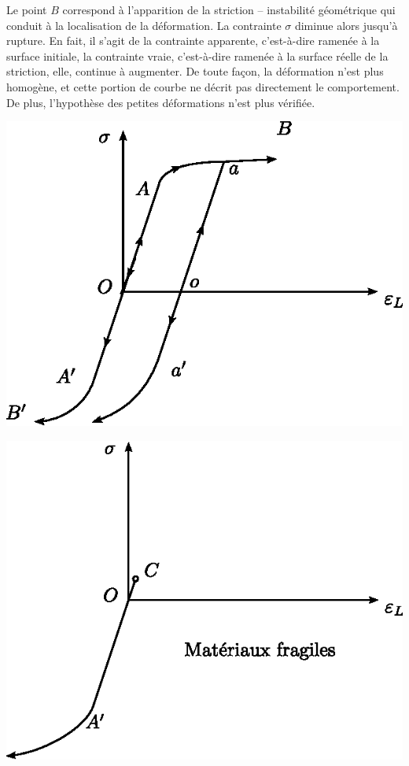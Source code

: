 Le point $B$ correspond à l'apparition de la striction -- instabilité géométrique qui conduit à la localisation de la déformation.
La contrainte $\sigma$ diminue alors jusqu'à rupture.
En fait, il s'agit de la contrainte apparente, c'est-à-dire ramenée à la surface initiale, la contrainte vraie, c'est-à-dire ramenée à la surface réelle de la striction, elle, continue à augmenter.
De toute façon, la déformation n'est plus homogène, et cette portion de courbe ne décrit pas directement le comportement.
De plus, l'hypothèse des petites déformations n'est plus vérifiée.
\begin{multicols}{2}
    \begin{center}
        \includegraphics{../images/T1_Ch04-0013}
    \end{center}
    \columnbreak
    \begin{center}
        \includegraphics{../images/T1_Ch04-0014}
    \end{center}
\end{multicols}
